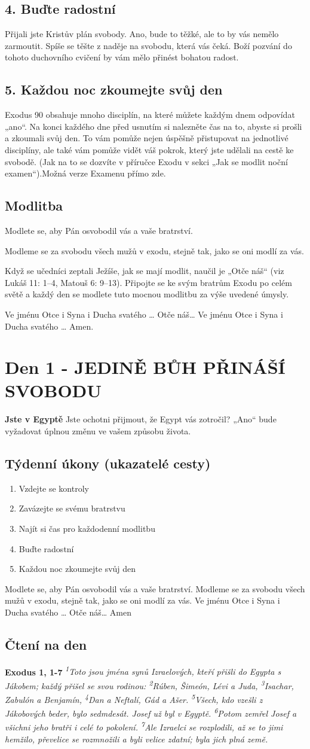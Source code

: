\documentclass[11pt]{article}
\newcommand{\zacatekPrvniTyden}{
  \textbf{Jste v Egyptě} \newline
  Jste ochotni přijmout, že Egypt vás zotročil? „Ano“ bude vyžadovat úplnou změnu ve vašem způsobu života.

\subsection*{Týdenní úkony (ukazatelé cesty)}
\begin{enumerate}
  \item Vzdejte se kontroly
  \item Zavázejte se svému bratrstvu
  \item Najít si čas pro každodenní modlitbu
  \item Buďte radostní
  \item Každou noc zkoumejte svůj den
\end{enumerate}
Modlete se, aby Pán osvobodil vás a vaše bratrství. \newline
Modleme se za svobodu všech mužů v exodu, stejně tak, jako se oni modlí za vás.\newline
Ve jménu Otce i Syna i Ducha svatého …  Otče náš… Amen
}
\begin{document}
\subsection*{4. Buďte radostní}
Přijali jste Kristův plán svobody. Ano, bude to těžké, ale to by vás nemělo zarmoutit. Spíše se těšte z naděje na svobodu, která vás čeká. Boží pozvání do tohoto duchovního cvičení by vám mělo přinést bohatou radost.

\subsection*{5. Každou noc zkoumejte svůj den}
Exodus 90 obsahuje mnoho disciplín, na které můžete každým dnem odpovídat „ano“. Na konci každého dne před usnutím si nalezněte čas na to, abyste si prošli a zkoumali svůj den. To vám pomůže nejen úspěšně přistupovat na jednotlivé disciplíny, ale také vám pomůže vidět váš pokrok, který jste udělali na cestě ke svobodě. (Jak na to se dozvíte v příručce Exodu v sekci „Jak se modlit noční examen“).Možná verze Examenu přímo zde.

\subsection*{Modlitba}
Modlete se, aby Pán osvobodil vás a vaše bratrství.

Modleme se za svobodu všech mužů v exodu, stejně tak, jako se oni modlí za vás.

Když se učedníci zeptali Ježíše, jak se mají modlit, naučil je „Otče náš“ (viz Lukáš 11: 1–4, Matouš 6: 9–13). Připojte se ke svým bratrům Exodu po celém světě a každý den se modlete tuto mocnou modlitbu za výše uvedené úmysly.

Ve jménu Otce i Syna i Ducha svatého …  Otče náš… Ve jménu Otce i Syna i Ducha svatého … Amen.

\newpage
\section{Den 1 - JEDINĚ BŮH PŘINÁŠÍ SVOBODU}
\zacatekPrvniTyden
\subsection*{Čtení na den}
\textbf{Exodus 1, 1-7}
\newline
\textit{
\textsuperscript{1}Toto jsou jména synů Izraelových, kteří přišli do Egypta s Jákobem; každý přišel se svou rodinou:
\textsuperscript{2}Rúben, Šimeón, Lévi a Juda,
\textsuperscript{3}Isachar, Zabulón a Benjamín,
\textsuperscript{4}Dan a Neftalí, Gád a Ašer.
\textsuperscript{5}Všech, kdo vzešli z Jákobových beder, bylo sedmdesát. Josef už byl v Egyptě.
\textsuperscript{6}Potom zemřel Josef a všichni jeho bratři i celé to pokolení.
\textsuperscript{7}Ale Izraelci se rozplodili, až se to jimi hemžilo, převelice se rozmnožili a byli velice zdatní; byla jich plná země.
}
\end{document}
